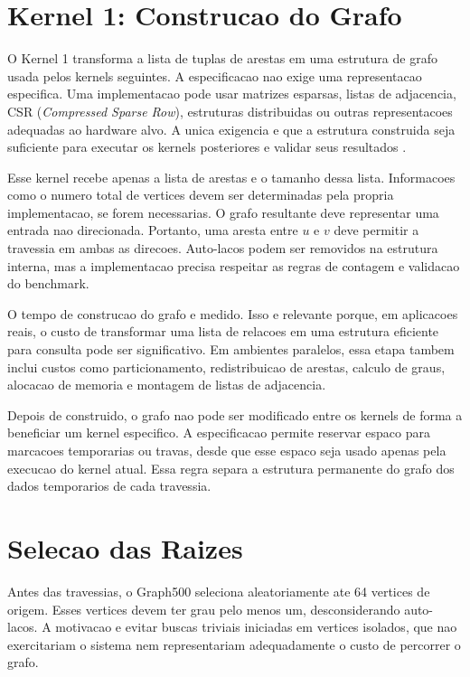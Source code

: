 \section{Kernel 1: Construcao do Grafo}

O Kernel 1 transforma a lista de tuplas de arestas em uma estrutura de grafo usada
pelos kernels seguintes. A especificacao nao exige uma representacao especifica.
Uma implementacao pode usar matrizes esparsas, listas de adjacencia, CSR
(\textit{Compressed Sparse Row}), estruturas distribuidas ou outras
representacoes adequadas ao hardware alvo. A unica exigencia e que a estrutura
construida seja suficiente para executar os kernels posteriores e validar seus
resultados \cite{graph500spec}.

Esse kernel recebe apenas a lista de arestas e o tamanho dessa lista. Informacoes
como o numero total de vertices devem ser determinadas pela propria
implementacao, se forem necessarias. O grafo resultante deve representar uma
entrada nao direcionada. Portanto, uma aresta entre $u$ e $v$ deve permitir a
travessia em ambas as direcoes. Auto-lacos podem ser removidos na estrutura
interna, mas a implementacao precisa respeitar as regras de contagem e validacao
do benchmark.

O tempo de construcao do grafo e medido. Isso e relevante porque, em aplicacoes
reais, o custo de transformar uma lista de relacoes em uma estrutura eficiente
para consulta pode ser significativo. Em ambientes paralelos, essa etapa tambem
inclui custos como particionamento, redistribuicao de arestas, calculo de graus,
alocacao de memoria e montagem de listas de adjacencia.

Depois de construido, o grafo nao pode ser modificado entre os kernels de forma a
beneficiar um kernel especifico. A especificacao permite reservar espaco para
marcacoes temporarias ou travas, desde que esse espaco seja usado apenas pela
execucao do kernel atual. Essa regra separa a estrutura permanente do grafo dos
dados temporarios de cada travessia.

\section{Selecao das Raizes}

Antes das travessias, o Graph500 seleciona aleatoriamente ate 64 vertices de
origem. Esses vertices devem ter grau pelo menos um, desconsiderando auto-lacos.
A motivacao e evitar buscas triviais iniciadas em vertices isolados, que nao
exercitariam o sistema nem representariam adequadamente o custo de percorrer o
grafo.

